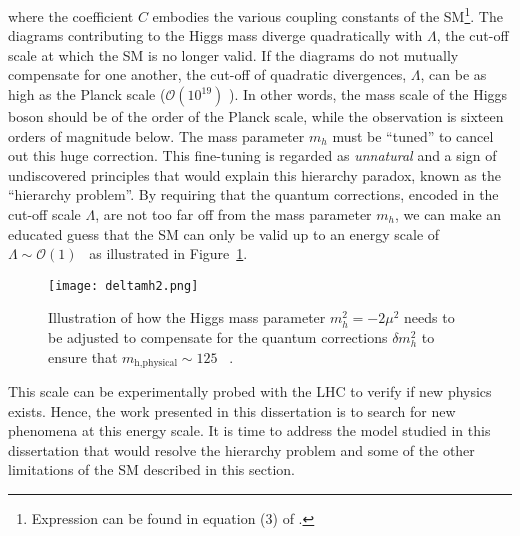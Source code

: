 where the coefficient $C$ embodies the various coupling constants of the SM\footnote{Expression can be found in equation (3) of \cite{Baer:2015fsa}.}.
The diagrams contributing to the Higgs mass diverge quadratically with $\Lambda$, the cut-off scale at which the SM is no longer valid.
If the diagrams do not mutually compensate for one another, the cut-off of quadratic divergences, $\Lambda$, can be as high as the Planck scale ($\mathcal{O}\left(10^{19}\right)$ \GeV).
In other words, the mass scale of the Higgs boson should be of the order of the Planck scale, while the observation is sixteen orders of magnitude below.
The mass parameter $m_h$ must be ``tuned'' to cancel out this huge correction.
This fine-tuning is regarded as \textit{unnatural} and a sign of undiscovered principles that would explain this hierarchy paradox, known as the ``hierarchy problem''.
By requiring that the quantum corrections, encoded in the cut-off scale $\Lambda$, are not too far off from the mass parameter $m_h$, we can make an educated 
guess that the SM can only be valid up to an energy scale of $\Lambda \sim \mathcal{O}\left(1\right)$ \TeV~as illustrated in Figure~\ref{fig:theory.sm.deltamh2}.
\begin{figure}[htb!]
\centering
\texttt{[image: deltamh2.png]}
\caption{Illustration of how the Higgs mass parameter $m_h^2 = -2\mu^2$ needs to be adjusted to compensate for the quantum corrections $\delta m_h^2$ to ensure 
that $m_\text{h,physical} \sim 125$ \GeV~\cite{Bae:2015jea}.}
\label{fig:theory.sm.deltamh2}
\end{figure} 
This scale can be experimentally probed with the LHC to verify if new physics exists. Hence, the work presented in this dissertation is to search for new phenomena 
at this energy scale.
It is time to address the model studied in this dissertation that would resolve the hierarchy problem and some of the other limitations of the SM described in this section.
